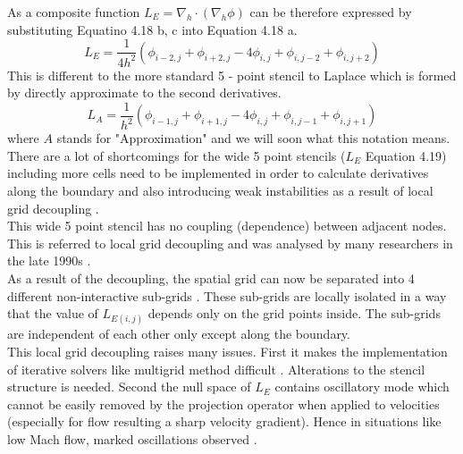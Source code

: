 As a composite function $\textit{L}_E = \nabla_h \cdot (\nabla_h\phi)$ can be therefore expressed by substituting Equatino 4.18 b, c into Equation 4.18 a.\\
\begin{equation}
\textit{L}_E = \dfrac{1}{4 h^2} (\phi_{i-2,j} + \phi_{i+2,j} - 4 \phi_{i,j} + \phi_{i,j-2} + \phi_{i,j+2})
\end{equation}
This is different to the more standard 5 - point stencil to Laplace which is formed by directly approximate to the second derivatives.
\begin{equation}
\textit{L}_A = \dfrac{1}{h^2} (\phi_{i-1,j} + \phi_{i+1,j} - 4 \phi_{i,j} + \phi_{i,j-1} + \phi_{i,j+1})
\end{equation}
where $A$ stands for "Approximation" and we will soon what this notation means.\\

There are a lot of shortcomings for the wide 5 point stencils ($\textit{L}_E$ Equation 4.19) including more cells need to be implemented in order to calculate derivatives along the boundary and also introducing weak instabilities as a result of local grid decoupling \cite{brown2001accurate,almgren1996numerical,almgren2000approximate,howell1997adaptive,minion1996projection}.\\

This wide 5 point stencil has no coupling (dependence) between adjacent nodes. This is referred to local grid decoupling and was analysed by many researchers in the late 1990s \cite{almgren1996numerical,almgren2000approximate,howell1997adaptive,minion1996projection}.\\
As a result of the decoupling, the spatial grid can now be separated into 4 different non-interactive sub-grids \cite{howell1997adaptive,minion1996projection}. These sub-grids are locally isolated in a way that the value of $\textit{L}_{E (i,j)}$ depends only on the grid points inside. The sub-grids are independent of each other only except along the boundary.\\

This local grid decoupling raises many issues. First it makes the implementation of iterative solvers like multigrid method difficult \cite{almgren1996numerical,almgren2000approximate,howell1997adaptive}. Alterations to the stencil structure is needed. Second the null space of $\textit{L}_E$ contains oscillatory mode which cannot be easily removed by the projection operator when applied to velocities \cite{minion1996projection} (especially for flow resulting a sharp velocity gradient). Hence in situations like low Mach flow, marked oscillations observed \cite{lal1993projection}.\\

